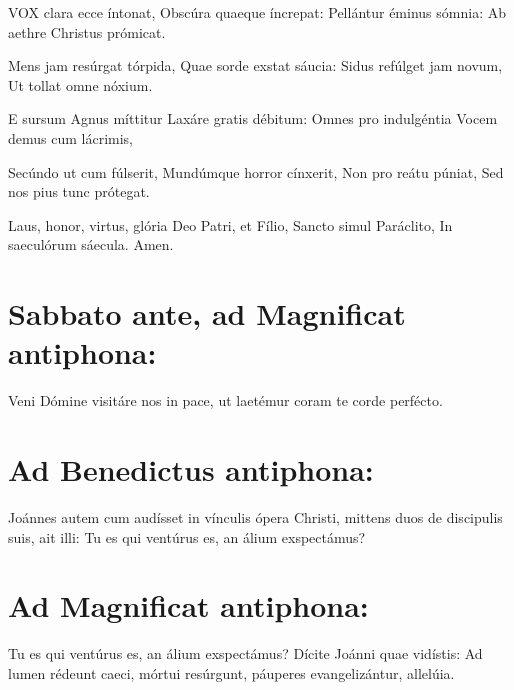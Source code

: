 \documentclass[a4paper, twoside, 12pt]{article}
\begin{document}
VOX clara ecce íntonat,
Obscúra quaeque íncrepat:
Pellántur éminus sómnia:
Ab aethre Christus prómicat. 	

Mens jam resúrgat tórpida,
Quae sorde exstat sáucia:
Sidus refúlget jam novum,
Ut tollat omne nóxium. 	

E sursum Agnus míttitur
Laxáre gratis débitum:
Omnes pro indulgéntia
Vocem demus cum lácrimis, 	

Secúndo ut cum fúlserit,
Mundúmque horror cínxerit,
Non pro reátu púniat,
Sed nos pius tunc prótegat. 	

Laus, honor, virtus, glória
Deo Patri, et Fílio,
Sancto simul Paráclito,
In saeculórum sáecula. Amen.

\section{Sabbato ante, ad Magnificat antiphona:}

Veni Dómine visitáre nos in pace,
ut laetémur coram te corde perfécto.

\section{Ad Benedictus antiphona:}

Joánnes autem cum audísset in vínculis ópera Christi,
mittens duos de discipulis suis, ait illi:
Tu es qui ventúrus es, an álium exspectámus?

\section{Ad Magnificat antiphona:}

Tu es qui ventúrus es, an álium exspectámus?
Dícite Joánni quae vidístis:
Ad lumen rédeunt caeci,
mórtui resúrgunt, 
páuperes evangelizántur, allelúia.
\end{document}
